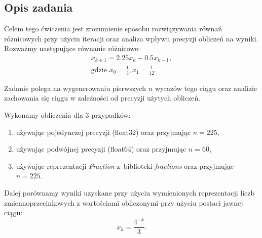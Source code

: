 \subsection{Opis zadania}

\quad Celem tego ćwiczenia jest zrozumienie sposobu rozwiązywania równań różnicowych przy użyciu iteracji oraz analiza wpływu precyzji obliczeń na wyniki.
Rozważmy następujące równanie różnicowe:
\begin{align*}
        x_{k+1} = 2.25x_k - 0.5x_{k-1},\\
        \textrm{gdzie } x_0 = \frac{1}{3}, x_1 = \frac{1}{12}.
\end{align*}

Zadanie polega na wygenerowaniu pierwszych $n$ wyrazów tego ciągu oraz analizie zachowania się ciągu w zależności od precyzji użytych obliczeń.

Wykonamy obliczenia dla 3 przypadków:
\begin{enumerate}
    \item używając pojedynczej precyzji (float32) oraz przyjmując $n = 225$,
    \item używając podwójnej precyzji (float64) oraz przyjmując $n = 60$,
    \item używając reprezentacji \emph{Fraction} z~biblioteki \emph{fractions} oraz przyjmując $n = 225$.
\end{enumerate}

Dalej porównamy wyniki uzyskane przy użyciu wymienionych reprezentacji liczb zmiennoprzecinkowych z wartościami obliczonymi przy użyciu postaci jawnej ciągu:
$$
x_k = \frac{4^{-k}}{3}.
$$